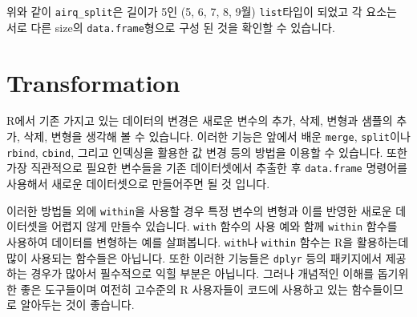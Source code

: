 \documentclass[
  a4paper,
]{book}
\newenvironment{Shaded}{\begin{snugshade}}{\end{snugshade}}
\newcommand{\DocumentationTok}[1]{\textcolor[rgb]{0.37,0.37,0.37}{\textit{#1}}}
\newcommand{\FunctionTok}[1]{\textcolor[rgb]{0.28,0.35,0.67}{#1}}
\newcommand{\NormalTok}[1]{\textcolor[rgb]{0.00,0.23,0.31}{#1}}
\newcommand{\OtherTok}[1]{\textcolor[rgb]{0.00,0.23,0.31}{#1}}
\newcommand{\SpecialCharTok}[1]{\textcolor[rgb]{0.37,0.37,0.37}{#1}}
\newcommand{\StringTok}[1]{\textcolor[rgb]{0.13,0.47,0.30}{#1}}
\begin{document}
위와 같이 \texttt{airq\_split}은 길이가 5인 (5, 6, 7, 8, 9월)
\texttt{list}타입이 되었고 각 요소는 서로 다른 size의
\texttt{data.frame}형으로 구성 된 것을 확인할 수 있습니다.

\hypertarget{transformation}{%
\section{Transformation}\label{transformation}}

R에서 기존 가지고 있는 데이터의 변경은 새로운 변수의 추가, 삭제, 변형과
샘플의 추가, 삭제, 변형을 생각해 볼 수 있습니다. 이러한 기능은 앞에서
배운 \texttt{merge}, \texttt{split}이나 \texttt{rbind}, \texttt{cbind},
그리고 인덱싱을 활용한 값 변경 등의 방법을 이용할 수 있습니다. 또한 가장
직관적으로 필요한 변수들을 기존 데이터셋에서 추출한 후
\texttt{data.frame} 명령어를 사용해서 새로운 데이터셋으로 만들어주면 될
것 입니다.

이러한 방법들 외에 \texttt{within}을 사용할 경우 특정 변수의 변형과 이를
반영한 새로운 데이터셋을 어렵지 않게 만들수 있습니다. \texttt{with}
함수의 사용 예와 함께 \texttt{within} 함수를 사용하여 데이터를 변형하는
예를 살펴봅니다. \texttt{with}나 \texttt{within} 함수는 R을 활용하는데
많이 사용되는 함수들은 아닙니다. 또한 이러한 기능들은 \texttt{dplyr}
등의 패키지에서 제공하는 경우가 많아서 필수적으로 익힐 부분은 아닙니다.
그러나 개념적인 이해를 돕기위한 좋은 도구들이며 여전히 고수준의 R
사용자들이 코드에 사용하고 있는 함수들이므로 알아두는 것이 좋습니다.

\begin{Shaded}
\end{Shaded}
\end{document}
